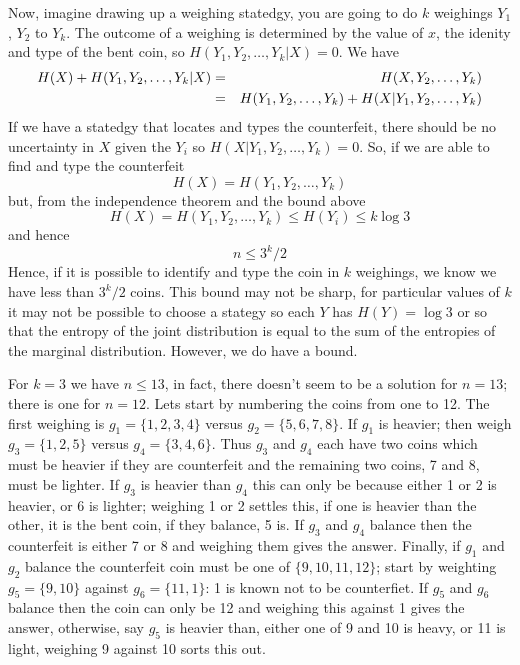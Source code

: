 \documentclass[12pt]{article}
\begin{document}
Now, imagine drawing up a weighing statedgy, you are going to do $k$
weighings $Y_1$, $Y_2$ to $Y_k$. The outcome of a weighing is determined by the value of
$x$, the idenity and type of the bent coin, so $H(Y_1,Y_2,\ldots, Y_k|X)=0$. We have
\begin{eqnarray}
  H(X)+H(Y_1,Y_2,\ldots, Y_k|X)&=&H(X,Y_2,\ldots, Y_k)\cr
  &=&H(Y_1,Y_2,\ldots,Y_k)+H(X|Y_1,Y_2,\ldots,Y_k)
\end{eqnarray}
If we have a statedgy that locates and types the counterfeit, there should be no uncertainty in $X$ given the $Y_i$ so 
$H(X|Y_1,Y_2,\ldots,Y_k)=0$. So, if we are able to find and type the counterfeit
\begin{equation}
H(X)=H(Y_1,Y_2,\ldots,Y_k)
\end{equation}
but, from the independence theorem and the bound above
\begin{equation}
H(X)=H(Y_1,Y_2,\ldots,Y_k)\le H(Y_i)\le k\log{3}
\end{equation}
and hence
\begin{equation}
n\le 3^{k}/2
\end{equation}
Hence, if it is possible to identify and type the coin in $k$
weighings, we know we have less than $3^k/2$ coins. This bound may not
be sharp, for particular values of $k$ it may not be possible to
choose a stategy so each $Y$ has $H(Y)=\log{3}$ or so that the entropy
of the joint distribution is equal to the sum of the entropies of the
marginal distribution. However, we do have a bound.

For $k=3$ we have $n\le 13$, in fact, there doesn't seem to be a
solution for $n=13$; there is one for $n=12$. Lets start by numbering
the coins from one to 12. The first weighing is $g_1=\{1,2,3,4\}$
versus $g_2=\{5,6,7,8\}$. If $g_1$ is heavier; then weigh
$g_3=\{1,2,5\}$ versus $g_4=\{3,4,6\}$. Thus $g_3$ and $g_4$ each have
two coins which must be heavier if they are counterfeit and the
remaining two coins, 7 and 8, must be lighter. If $g_3$ is heavier
than $g_4$ this can only be because either 1 or 2 is heavier, or 6 is
lighter; weighing 1 or 2 settles this, if one is heavier than the
other, it is the bent coin, if they balance, 5 is. If $g_3$ and $g_4$
balance then the counterfeit is either 7 or 8 and weighing them gives
the answer. Finally, if $g_1$ and $g_2$ balance the counterfeit coin
must be one of $\{9,10,11,12\}$; start by weighting $g_5=\{9,10\}$
against $g_6=\{11,1\}$: 1 is known not to be counterfiet. If $g_5$ and
$g_6$ balance then the coin can only be 12 and weighing this against 1
gives the answer, otherwise, say $g_5$ is heavier than, either one of
9 and 10 is heavy, or 11 is light, weighing 9 against 10 sorts this
out.
\end{document}
